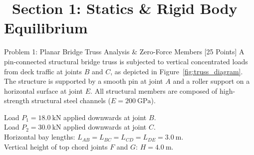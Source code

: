 \documentclass[11pt, a4paper, titlepage=false]{scrartcl}
\begin{document}
\vspace{6pt}

\section*{\textcolor{PrimaryDark}{\faLayerGroup\ Section 1: Statics \& Rigid Body Equilibrium}}

\begin{problembox}{Problem 1: Planar Bridge Truss Analysis \& Zero-Force Members \hfill [25 Points]}
    A pin-connected structural bridge truss is subjected to vertical concentrated loads from deck traffic at joints $B$ and $C$, as depicted in Figure~\ref{fig:truss_diagram}. The structure is supported by a smooth pin at joint $A$ and a roller support on a horizontal surface at joint $E$. All structural members are composed of high-strength structural steel channels ($E = \SI{200}{\giga\pascal}$).

    \begin{givenbox}
        Load $P_1 = \SI{18.0}{\kilo\newton}$ applied downwards at joint $B$.\\
        Load $P_2 = \SI{30.0}{\kilo\newton}$ applied downwards at joint $C$.\\
        Horizontal bay lengths: $L_{AB} = L_{BC} = L_{CD} = L_{DE} = \SI{3.0}{\meter}$.\\
        Vertical height of top chord joints $F$ and $G$: $H = \SI{4.0}{\meter}$.
    \end{givenbox}

    \begin{center}
\end{center}
\end{problembox}
\end{document}
